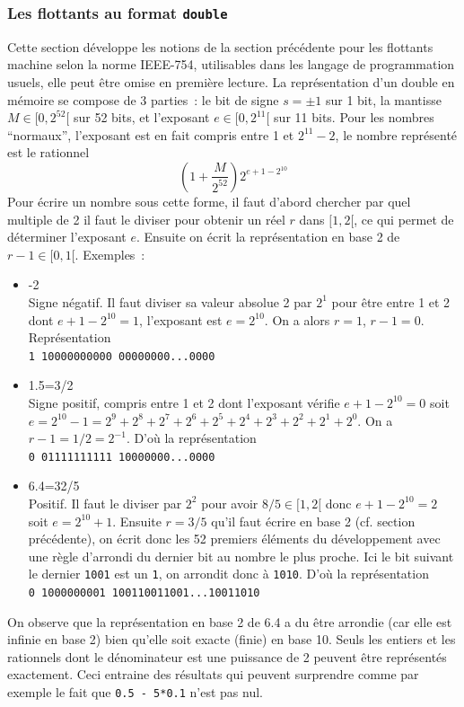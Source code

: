 \documentclass[a4paper,11pt]{article}
\begin{document}
\subsubsection{Les flottants au format {\tt double}} 
 
Cette section d\'eveloppe les notions de la section pr\'ec\'edente
pour les flottants machine selon la norme IEEE-754, utilisables dans les langage de
programmation usuels, elle peut \^etre omise en première lecture.
La représentation d'un double
en mémoire se compose de 3 parties~: le bit 
de signe $s=\pm 1$ sur 1 bit, 
la mantisse $M \in [0,2^{52}[$ sur 52 bits, 
et l'exposant $e \in [0, 2^{11}[$ sur 11 bits. Pour les nombres
``normaux'', l'exposant est en fait compris entre 1 et $2^{11}-2$,
le nombre repr\'esent\'e est le rationnel
\[ (1+\frac{M}{2^{52}}) 2^{e+1-2^{10}} \]
Pour \'ecrire un nombre sous cette forme, il faut d'abord chercher par
quel multiple de 2 il faut le diviser pour obtenir un r\'eel $r$ dans
$[1,2[$, ce qui permet de d\'eterminer l'exposant $e$. Ensuite on
\'ecrit la repr\'esentation en base 2 de $r-1 \in [0,1[$.
Exemples~:
\begin{itemize}
\item -2 \\
Signe n\'egatif. Il faut diviser sa valeur absolue 
2 par $2^1$ pour \^etre entre 1 et 2 dont
$e+1-2^{10}=1$, l'exposant est $e=2^{10}$. On a alors $r=1$, $r-1=0$.
Repr\'esentation \\
\verb|1 10000000000 00000000...0000|
\item 1.5=3/2\\
Signe positif, compris entre 1 et 2 dont l'exposant v\'erifie
$e+1-2^{10}=0$ soit
$e=2^{10}-1=2^9+2^8+2^7+2^6+2^5+2^4+2^3+2^2+2^1+2^0$. 
On a $r-1=1/2=2^{-1}$. D'o\`u la repr\'esentation\\
\verb|0 01111111111 10000000...0000|
\item 6.4=32/5\\
Positif. Il faut le diviser par $2^{2}$ pour avoir $8/5 \in [1,2[$
donc $e+1-2^{10}=2$ soit $e=2^{10}+1$. Ensuite $r=3/5$ qu'il faut
\'ecrire en base 2 (cf. section pr\'ec\'edente),
on \'ecrit donc les 52 premiers \'el\'ements du d\'eveloppement
avec une r\`egle d'arrondi du dernier bit au nombre le plus proche. 
Ici le bit suivant le dernier \verb|1001| est un \verb|1|, on arrondit
donc \`a \verb|1010|. D'o\`u la repr\'esentation\\
\verb|0 1000000001 100110011001...10011010|\\
\end{itemize}
On observe que la repr\'esentation en base 2 de 6.4 a du \^etre
arrondie (car elle est infinie en base 2) bien qu'elle soit exacte
(finie) en base 10.
Seuls les entiers et les rationnels dont le d\'enominateur est une puissance
de 2 peuvent \^etre repr\'esent\'es exactement.
Ceci entraine des r\'esultats qui peuvent surprendre
comme par exemple le fait que
\verb|0.5 - 5*0.1| n'est pas nul.
\end{document}
